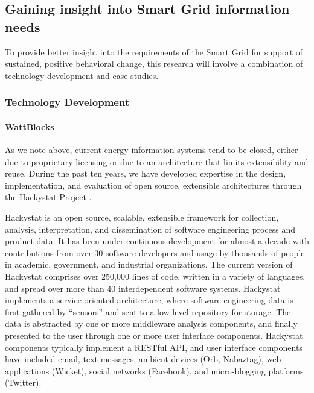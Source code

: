 \subsection{Gaining insight into Smart Grid information needs}
\label{sec:methodology}

To provide better insight into the requirements of the Smart Grid for
support of sustained, positive behavioral change, this research will
involve a combination of  technology development and case studies.

\subsubsection{Technology Development}

\paragraph{WattBlocks}

As we note above, current energy information systems tend to be closed,
either due to proprietary licensing or due to an architecture that limits
extensibility and reuse.  During the past ten years, we have developed
expertise in the design, implementation, and evaluation of open source,
extensible architectures through the Hackystat Project
\cite{csdl2-06-06,csdl2-09-02,csdl2-09-07,csdl2-09-01}.

Hackystat is an open source, scalable, extensible framework for collection,
analysis, interpretation, and dissemination of software engineering process
and product data.  It has been under continuous development for almost a
decade with contributions from over 30 software developers and usage by
thousands of people in academic, government, and industrial
organizations. The current version of Hackystat comprises over 250,000
lines of code, written in a variety of languages, and spread over more than
40 interdependent software systems.  Hackystat implements a
service-oriented architecture, where software engineering data is first
gathered by ``sensors'' and sent to a low-level repository for storage.
The data is abstracted by one or more middleware analysis components, and
finally presented to the user through one or more user interface
components.  Hackystat components typically implement a RESTful API, and
user interface components have included email, text messages, ambient
devices (Orb, Nabaztag), web applications (Wicket), social networks
(Facebook), and micro-blogging platforms (Twitter).


